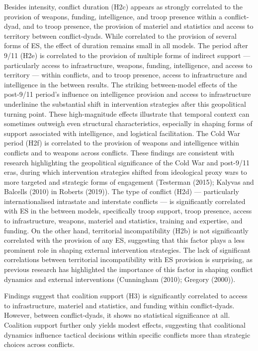 \documentclass[
]{article}
\begin{document}
Besides intensity, conflict duration (H2c) appears as strongly
correlated to the provision of weapons, funding, intelligence, and troop
presence within a conflict-dyad, and to troop presence, the provision of
materiel and statistics and access to territory between conflict-dyads.
While correlated to the provision of several forms of ES, the effect of
duration remains small in all models. The period after 9/11 (H2e) is
correlated to the provision of multiple forms of indirect support ---
particularly access to infrastructure, weapons, funding, intelligence,
and access to territory --- within conflicts, and to troop presence,
access to infrastructure and intelligence in the between results. The
striking between-model effects of the post-9/11 period's influence on
intelligence provision and access to infrastructure underlinine the
substantial shift in intervention strategies after this geopolitical
turning point. These high-magnitude effects illustrate that temporal
context can sometimes outweigh even structural characteristics,
especially in shaping forms of support associated with intelligence, and
logistical facilitation. The Cold War period (H2f) is correlated to the
provision of weapons and intelligence within conflicts and to weapons
across conflicts. These findings are consistent with research
highlighting the geopolitical significance of the Cold War and post-9/11
eras, during which intervention strategies shifted from ideological
proxy wars to more targeted and strategic forms of engagement (Testerman
(2015); Kalyvas and Balcells (2010) in Roberts (2019)). The type of
conflict (H2d) --- particularly internationalised intrastate and
interstate conflicts --- is significantly correlated with ES in the
between models, specifically troop support, troop presence, access to
infrastructure, weapons, materiel and statistics, training and
expertise, and funding. On the other hand, territorial incompatibility
(H2b) is not significantly correlated with the provision of any ES,
suggesting that this factor plays a less prominent role in shaping
external intervention strategies. The lack of significant correlations
between territorial incompatibility with ES provision is surprising, as
previous research has highlighted the importance of this factor in
shaping conflict dynamics and external interventions (Cunningham (2010);
Gregory (2000)).

Findings suggest that coalition support (H3) is significantly correlated
to access to infrastructure, materiel and statistics, and funding within
conflict-dyads. However, between conflict-dyads, it shows no statistical
significance at all. Coalition support further only yields modest
effects, suggesting that coalitional dynamics influence tactical
decisions within specific conflicts more than strategic choices across
conflicts.
\end{document}
